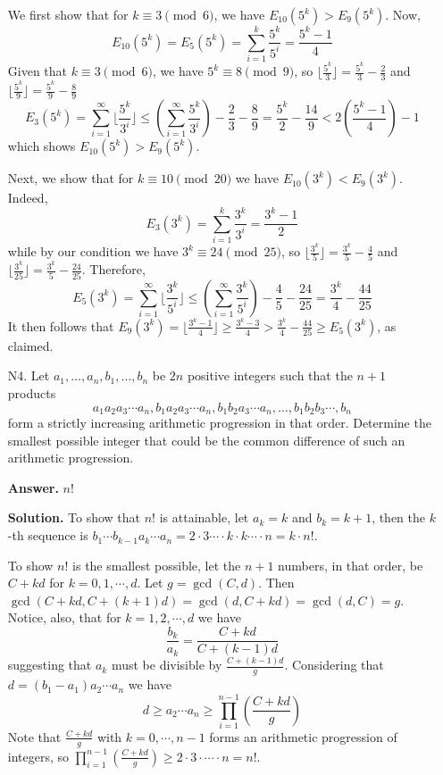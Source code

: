 \documentclass[11pt,a4paper]{article}
\begin{document}
\begin{enumerate}
    	We first show that for $k \equiv 3\pmod{6}$, we have 
    	$E_{10}(5^k) > E_9(5^k)$. 
    	Now, 
    	\[
    	E_{10}(5^k) = E_{5}(5^k) = 
    	\sum_{i = 1}^{k}\frac{5^k}{5^i}
    	=\frac{5^k - 1}{4}
    	\]
    	Given that $k\equiv 3\pmod{6}$, we have $5^k\equiv 8\pmod{9}$, 
    	so $\lfloor \frac{5^k}{3}\rfloor = \frac{5^k}{3} - \frac{2}{3}$ and 
    	$\lfloor \frac{5^k}{9}\rfloor = \frac{5^k}{9} - \frac{8}{9}$
    	\[
    	E_{3}(5^k) = 
    	\sum_{i = 1}^{\infty}\lfloor \frac{5^k}{3^i}\rfloor
    	\le (\sum_{i = 1}^{\infty}\frac{5^k}{3^i}) - \frac{2}{3} - \frac{8}{9}
    	=\frac{5^k}{2} - \frac{14}{9}
    	< 2\left(\frac{5^k - 1}{4}\right) - 1
    	\]
    	which shows $E_{10}(5^k) > E_9(5^k)$. 
    	
    	Next, we show that for $k\equiv 10\pmod{20}$ we have 
    	$E_{10}(3^k) < E_9(3^k)$. 
    	Indeed, 
    	\[
    	E_{3}(3^k) = 
    	\sum_{i = 1}^{k}\frac{3^k}{3^i}
    	=\frac{3^k - 1}{2}
    	\]
    	while by our condition we have $3^k\equiv 24\pmod{25}$, 
    	so $\lfloor \frac{3^k}{5}\rfloor = \frac{3^k}{5} - \frac{4}{5}$ and 
    	$\lfloor \frac{3^k}{25}\rfloor = \frac{3^k}{5} - \frac{24}{25}$. 
    	Therefore, 
    	\[
    	E_{5}(3^k) = 
    	\sum_{i = 1}^{\infty}\lfloor \frac{3^k}{5^i}\rfloor
    	\le (\sum_{i = 1}^{\infty}\frac{3^k}{5^i}) - \frac{4}{5} - \frac{24}{25}
    	=\frac{3^k }{4} - \frac{44}{25}
    	\]
    	It then follows that 
    	$E_{9}(3^k)=\lfloor \frac{3^k - 1}{4}\rfloor
    	\ge  \frac{3^k - 3}{4} > \frac{3^k }{4} - \frac{44}{25} \ge E_{5}(3^k)$, 
    	as claimed. 
    	
    	\item [N4.]
    	Let $a_1, \dots, a_n, b_1, \dots, b_n$ be $2n$ positive integers such that the $n+1$ products
    	\[a_1 a_2 a_3 \cdots a_n, b_1 a_2 a_3 \cdots a_n, b_1 b_2 a_3 \cdots a_n, \dots, b_1 b_2 b_3 \cdots, b_n\]form a strictly increasing arithmetic progression in that order. Determine the smallest possible integer that could be the common difference of such an arithmetic progression.
    	
    	\textbf{Answer.} $n!$
    	
    	\textbf{Solution.} 
    	To show that $n!$ is attainable, let $a_k = k$ and $b_k = k + 1$, 
    	then the $k$-th sequence is $b_1\cdots b_{k-1}a_k\cdots a_n = 2\cdot 3\cdots \cdot k \cdot k \cdots \cdot n = k\cdot n!$. 
    	
    	To show $n!$ is the smallest possible, 
    	let the $n + 1$ numbers, in that order, be 
    	$C + kd$ for $k = 0, 1, \cdots, d$. 
    	Let $g = \gcd(C, d)$. 
    	Then $\gcd(C + kd, C + (k + 1)d) = \gcd(d, C + kd) = \gcd(d, C) = g$. 
    	Notice, also, that for $k=1, 2, \cdots, d$ we have 
    	\[
    	\frac{b_k}{a_k} = \frac{C + kd}{C + (k - 1)d}
    	\]
    	suggesting that $a_k$ must be divisible by $\frac{C + (k - 1)d}{g}$. 
    	Considering that $d = (b_1 - a_1)a_2\cdots a_n$ we have 
    	\[
    	d\ge a_2\cdots a_n \ge \prod_{i=1}^{n - 1} \left(\frac{C + kd}{g}\right)
    	\]
    	Note that $\frac{C + kd}{g}$ with $k=0, \cdots, n - 1$ forms an arithmetic progression of integers, 
    	so $\prod_{i=1}^{n - 1} \left(\frac{C + kd}{g}\right) \ge 2\cdot 3\cdot \cdots \cdot n = n!$. 
    	

\end{enumerate}
\end{document}
